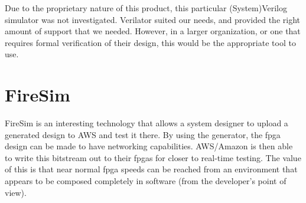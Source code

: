 Due to the proprietary nature of this product, this particular (System)Verilog simulator was not investigated.
Verilator suited our needs, and provided the right amount of support that we needed.
However, in a larger organization, or one that requires formal verification of their design, this would be the appropriate tool to use.

\section{FireSim}\label{sec:FireSim_Simulator}
\nocite{firesimPresentation}
FireSim is an interesting technology that allows a system designer to upload a generated design to AWS and test it there.
By using the  generator, the \gls{fpga} design can be made to have networking capabilities.
AWS/Amazon is then able to write this bitstream out to their \glspl{fpga} for closer to real-time testing.
The value of this is that near normal \gls{fpga} speeds can be reached from an environment that appears to be composed completely in software (from the developer's point of view).

